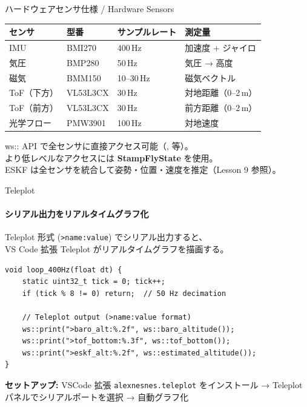 \documentclass[aspectratio=169, 14pt]{beamer}
\begin{document}
\begin{frame}{ハードウェアセンサ仕様 / Hardware Sensors}
  \centering

  {\small
  \begin{tabular}{llll}
    \hline
    \textbf{センサ} & \textbf{型番} & \textbf{サンプルレート} & \textbf{測定量} \\
    \hline
    IMU        & BMI270  & 400\,Hz  & 加速度 + ジャイロ \\
    気圧       & BMP280  & 50\,Hz   & 気圧 → 高度 \\
    磁気       & BMM150  & 10--30\,Hz & 磁気ベクトル \\
    ToF（下方） & VL53L3CX & 30\,Hz  & 対地距離（0--2\,m） \\
    ToF（前方） & VL53L3CX & 30\,Hz  & 前方距離（0--2\,m） \\
    光学フロー  & PMW3901 & 100\,Hz  & 対地速度 \\
    \hline
  \end{tabular}
  }

  \vspace{1em}

  {\footnotesize
    ws:: API で全センサに直接アクセス可能（,  等）。\\
    より低レベルなアクセスには \textbf{StampFlyState} を使用。\\
    ESKF は全センサを統合して姿勢・位置・速度を推定（Lesson 9 参照）。
  }
\end{frame}

\begin{frame}[fragile]{Teleplot}
  \framesubtitle{シリアル出力をリアルタイムグラフ化}
  {\small Teleplot 形式 (\texttt{>name:value}) でシリアル出力すると、\\
  VS Code 拡張 Teleplot がリアルタイムグラフを描画する。}

  \vspace{0.3em}

  \begin{lstlisting}[style=sfcpp, basicstyle=\ttfamily\scriptsize]
void loop_400Hz(float dt) {
    static uint32_t tick = 0; tick++;
    if (tick % 8 != 0) return;  // 50 Hz decimation

    // Teleplot output (>name:value format)
    ws::print(">baro_alt:%.2f", ws::baro_altitude());
    ws::print(">tof_bottom:%.3f", ws::tof_bottom());
    ws::print(">eskf_alt:%.2f", ws::estimated_altitude());
}
  \end{lstlisting}

  \vspace{0.2em}
  {\footnotesize
    \textbf{セットアップ:} VSCode 拡張 \texttt{alexnesnes.teleplot} をインストール
    → Teleplot パネルでシリアルポートを選択 → 自動グラフ化
  }
\end{frame}
\end{document}
